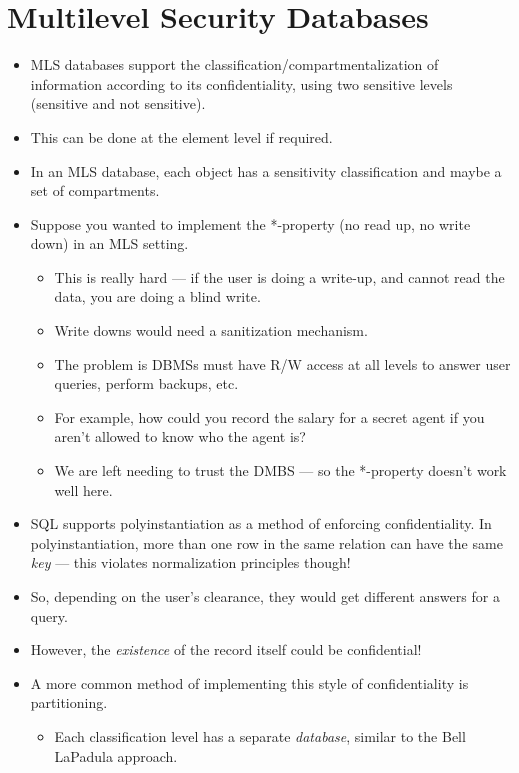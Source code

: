 \documentclass{article}
\begin{document}
\section{Multilevel Security Databases}
\begin{itemize}
    \item MLS databases support the classification/compartmentalization of information according to its confidentiality, using two sensitive levels (sensitive and not sensitive).
    \item This can be done at the element level if required.
    \item In an MLS database, each object has a sensitivity classification and maybe a set of compartments.
    \item Suppose you wanted to implement the *-property (no read up, no write down) in an MLS setting.
        \begin{itemize}
            \item This is really hard --- if the user is doing a write-up, and cannot read the data, you are doing a blind write.
            \item Write downs would need a sanitization mechanism.
            \item The problem is DBMSs must have R/W access at all levels to answer user queries, perform backups, etc.
            \item For example, how could you record the salary for a secret agent if you aren't allowed to know who the agent is?
            \item We are left needing to trust the DMBS --- so the *-property doesn't work well here.
        \end{itemize}
    \item SQL supports polyinstantiation as a method of enforcing confidentiality.  In polyinstantiation, more than one row in the same relation can have the same \emph{key} --- this violates normalization principles though!
    \item So, depending on the user's clearance, they would get different answers for a query.
    \item However, the \emph{existence} of the record itself could be confidential!
    \item A more common method of implementing this style of confidentiality is partitioning.
        \begin{itemize}
            \item Each classification level has a separate \emph{database}, similar to the Bell LaPadula approach.

\end{itemize}
\end{itemize}
\end{document}
